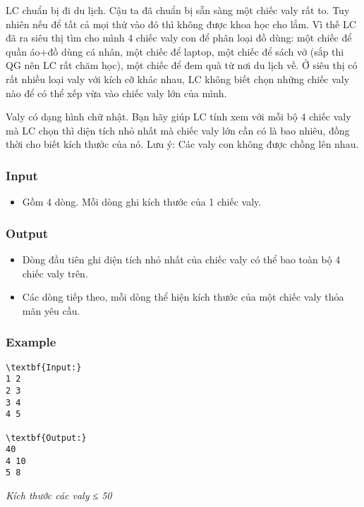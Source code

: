 

LC chuẩn bị đi du lịch. Cậu ta đã chuẩn bị sẵn sàng một chiếc valy rất to. Tuy nhiên nếu để tất cả mọi thứ vào đó thì không được khoa học cho lắm. Vì thế LC đã ra siêu thị tìm cho mình 4 chiếc valy con để phân loại đồ dùng: một chiếc để quần áo+đồ dùng cá nhân, một chiếc để laptop, một chiếc để sách vở (sắp thi QG nên LC rất chăm học), một chiếc để đem quà từ nơi du lịch về. Ở siêu thị có rất nhiều loại valy với kích cỡ khác nhau, LC không biết chọn những chiếc valy nào để có thể xếp vừa vào chiếc valy lớn của mình.

Valy có dạng hình chữ nhật. Bạn hãy giúp LC tính xem với mỗi bộ 4 chiếc valy mà LC chọn thì diện tích nhỏ nhất mà chiếc valy lớn cần có là bao nhiêu, đồng thời cho biết kích thước của nó. Lưu ý: Các valy con không được chồng lên nhau.

\subsubsection{Input}
\begin{itemize}
	\item Gồm 4 dòng. Mỗi dòng ghi kích thước của 1 chiếc valy.
\end{itemize}

\subsubsection{Output}
\begin{itemize}
	\item Dòng đầu tiên ghi diện tích nhỏ nhất của chiếc valy có thể bao toàn bộ 4 chiếc valy trên.
	\item Các dòng tiếp theo, mỗi dòng thể hiện kích thước của một chiếc valy thỏa mãn yêu cầu.
\end{itemize}

\subsubsection{Example}
\begin{verbatim}
\textbf{Input:}
1 2
2 3
3 4
4 5

\textbf{Output:}
40
4 10
5 8\end{verbatim}

\emph{Kích thước các valy ≤ 50}

 